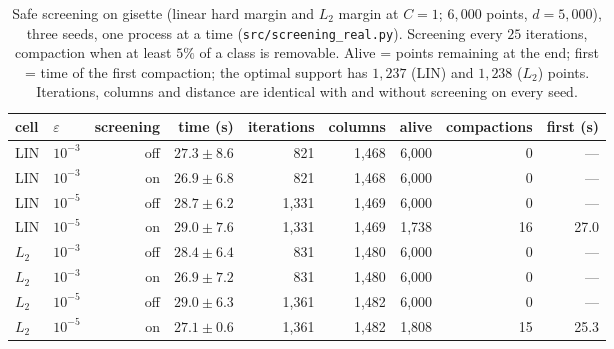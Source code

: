 \documentclass[pdflatex,sn-apa]{sn-jnl}%
\theoremstyle{thmstyleone}
\theoremstyle{thmstyletwo}
\begin{document}
\begin{table}[htbp]\centering\scriptsize\setlength{\tabcolsep}{4pt}
\caption{Safe screening on gisette (linear hard margin and $L_2$
margin at $C{=}1$; $6{,}000$ points, $d{=}5{,}000$), three seeds, one
process at a time (\texttt{src/screening\_real.py}). Screening every
$25$ iterations, compaction when at least $5\%$ of a class is
removable. Alive = points remaining at the end; first = time of the
first compaction; the optimal support has $1{,}237$ (LIN) and $1{,}238$
($L_2$) points. Iterations, columns and distance are identical with and
without screening on every seed.}\label{tab:screen}
\begin{tabular}{llrrrrrrr}\toprule
cell & $\varepsilon$ & screening & time (s) & iterations & columns & alive & compactions & first (s) \\\midrule
LIN & $10^{-3}$ & off & $27.3\pm8.6$ & 821 & 1,468 & 6,000 & 0 & --- \\
LIN & $10^{-3}$ & on & $26.9\pm6.8$ & 821 & 1,468 & 6,000 & 0 & --- \\
LIN & $10^{-5}$ & off & $28.7\pm6.2$ & 1,331 & 1,469 & 6,000 & 0 & --- \\
LIN & $10^{-5}$ & on & $29.0\pm7.6$ & 1,331 & 1,469 & 1,738 & 16 & 27.0 \\
\midrule
$L_2$ & $10^{-3}$ & off & $28.4\pm6.4$ & 831 & 1,480 & 6,000 & 0 & --- \\
$L_2$ & $10^{-3}$ & on & $26.9\pm7.2$ & 831 & 1,480 & 6,000 & 0 & --- \\
$L_2$ & $10^{-5}$ & off & $29.0\pm6.3$ & 1,361 & 1,482 & 6,000 & 0 & --- \\
$L_2$ & $10^{-5}$ & on & $27.1\pm0.6$ & 1,361 & 1,482 & 1,808 & 15 & 25.3 \\
\bottomrule\end{tabular}\end{table}
\end{document}
